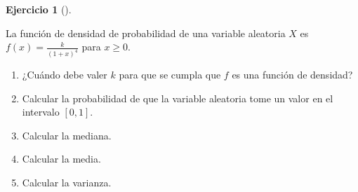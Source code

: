 \documentclass[
  a4paper,
]{scrreport}
\theoremstyle{definition}
\newtheorem{exercise}{Ejercicio}[chapter]
\theoremstyle{remark}
\begin{document}
\begin{exercise}[]\protect\hypertarget{exr-funcion-densidad}{}\label{exr-funcion-densidad}

La función de densidad de probabilidad de una variable aleatoria \(X\)
es \(f(x)=\frac{k}{(1+x)^4}\) para \(x\geq 0\).

\begin{enumerate}
\def\labelenumi{\alph{enumi}.}
\item
  ¿Cuándo debe valer \(k\) para que se cumpla que \(f\) es una función
  de densidad?
\item
  Calcular la probabilidad de que la variable aleatoria tome un valor en
  el intervalo \([0,1]\).
\item
  Calcular la mediana.
\item
  Calcular la media.
\item
  Calcular la varianza.
\end{enumerate}

\end{exercise}
\end{document}
